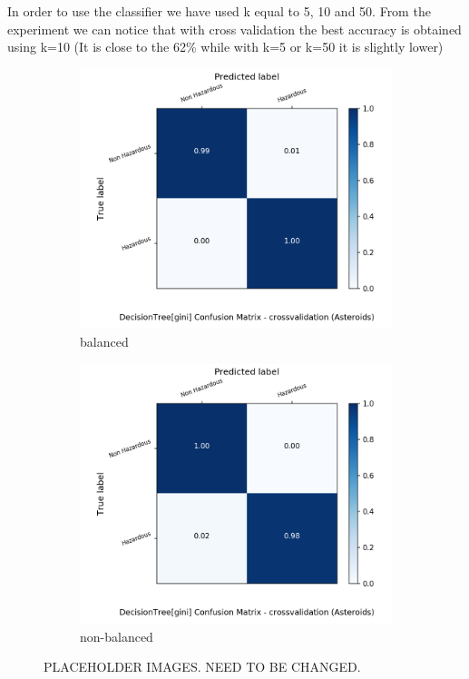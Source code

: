 \documentclass{article}
\begin{document}
In order to use the classifier we have used k equal to 5, 10 and 50.
From the experiment we can notice that with cross validation the best accuracy is obtained using k=10 (It is close to the 62\% while with k=5 or k=50 it is slightly lower)


\begin{figure}[H]
	\centering
	\begin{subfigure}{.5\textwidth}
		\centering
		\includegraphics[width=1.1\textwidth]{Plots/asteroids/asteroids_DecisionTree_gini_balance_True_crossvalidation.png}
		\caption{balanced}
	\end{subfigure}%
	\begin{subfigure}{.5\textwidth}
		\centering
		\includegraphics[width=1.1\textwidth]{Plots/asteroids/asteroids_DecisionTree_gini_balance_False_crossvalidation.png}
		\caption{non-balanced}
	\end{subfigure}
	\caption{{\color{red} PLACEHOLDER IMAGES. NEED TO BE CHANGED.}}
\end{figure}
\end{document}
